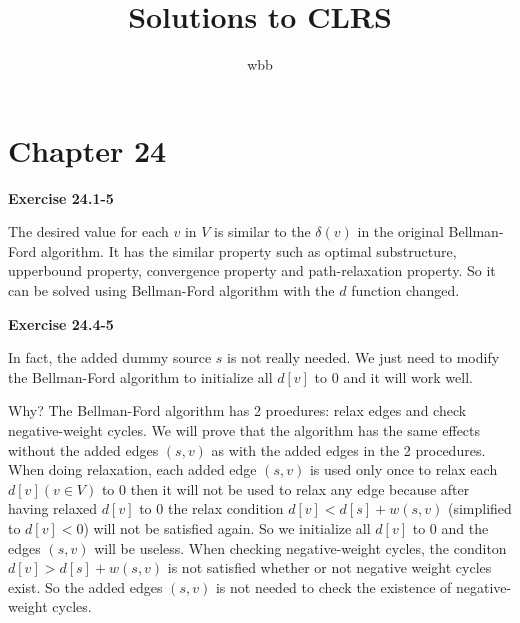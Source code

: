 \documentclass[11pt]{article}
\author{wbb}
\title{Solutions to CLRS}
\newcommand{\Exercise}[1]
    {\begin{flushleft}{\large \textbf{Exercise #1}}\end{flushleft}}
\begin{document}
\maketitle

\section*{Chapter 24}

\Exercise{24.1-5}

The desired value for each $v$ in $V$ is similar to the $\delta(v)$ in the
original Bellman-Ford algorithm.  It has the similar property such as
optimal substructure, upperbound property, convergence property and
path-relaxation property.  So it can be solved using Bellman-Ford algorithm
with the $d$ function changed.
  
\Exercise{24.4-5}

In fact, the added dummy source $s$ is not really needed.  We just need to
modify the Bellman-Ford algorithm to initialize all $d[v]$ to 0 and it will
work well.

Why? The Bellman-Ford algorithm has 2 proedures: relax edges and
check negative-weight cycles.  We will prove that the algorithm has
the same effects without the added edges $(s, v)$ as with the added
edges in the 2 procedures.  When doing relaxation, each added edge
$(s, v)$ is used only once to relax each $d[v] (v \in V)$ to 0 then it
will not be used to relax any edge because after having relaxed $d[v]$
to 0 the relax condition $d[v] < d[s] + w(s, v)$ (simplified to $d[v]
< 0$) will not be satisfied again.  So we initialize all $d[v]$ to 0
and the edges $(s, v)$ will be useless.  When checking negative-weight
cycles, the conditon $d[v] > d[s] + w(s, v)$ is not satisfied whether
or not negative weight cycles exist.  So the added edges $(s, v)$
is not needed to check the existence of negative-weight cycles.

%
% 
\end{document}
